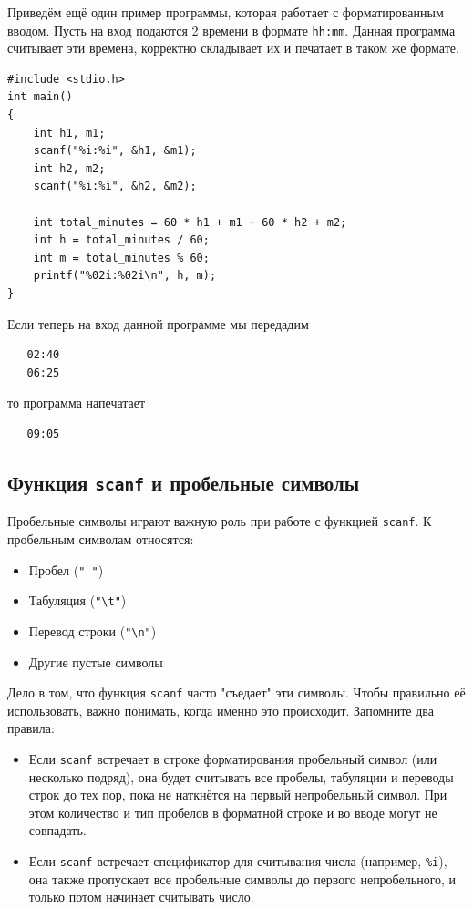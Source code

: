 \documentclass{article}
\begin{document}
\noindent Приведём ещё один пример программы, которая работает с форматированным вводом. Пусть на вход подаются 2 времени в формате \texttt{hh:mm}. Данная программа считывает эти времена, корректно складывает их и печатает в таком же формате.
\begin{lstlisting}
#include <stdio.h>
int main()
{
    int h1, m1;
    scanf("%i:%i", &h1, &m1);
    int h2, m2;
    scanf("%i:%i", &h2, &m2);

    int total_minutes = 60 * h1 + m1 + 60 * h2 + m2;
    int h = total_minutes / 60;
    int m = total_minutes % 60;
    printf("%02i:%02i\n", h, m);
}
\end{lstlisting}
Если теперь на вход данной программе мы передадим
\begin{verbatim}
   02:40 
   06:25
\end{verbatim}
то программа напечатает
\begin{verbatim}
   09:05
\end{verbatim}

\subsection*{Функция \texttt{scanf} и пробельные символы}
Пробельные символы играют важную роль при работе с функцией \texttt{scanf}. К пробельным символам относятся:
\begin{itemize}
\item Пробел (\texttt{{}"{} {}"{}})
\item Табуляция  (\texttt{"\textbackslash t"})
\item Перевод строки  (\texttt{"\textbackslash n"})
\item Другие пустые символы
\end{itemize}
Дело в том, что функция \texttt{scanf} часто "съедает"{} эти символы. Чтобы правильно её использовать, важно понимать, когда именно это происходит. Запомните два правила:
\begin{itemize}
\item Если \texttt{scanf} встречает в строке форматирования пробельный символ (или несколько подряд), она будет считывать все пробелы, табуляции и переводы строк до тех пор, пока не наткнётся на первый непробельный символ. При этом количество и тип пробелов в форматной строке и во вводе могут не совпадать.

\item Если \texttt{scanf} встречает спецификатор для считывания числа (например, \texttt{\%i}), она также пропускает все пробельные символы до первого непробельного, и только потом начинает считывать число.
\end{itemize}
 
\end{document}
